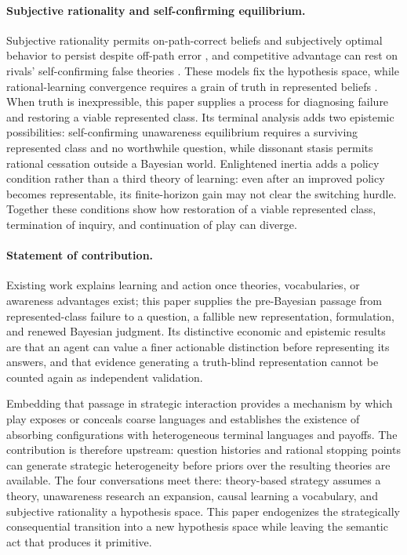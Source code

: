 \documentclass[11pt]{article}
\theoremstyle{definition}
\begin{document}
\paragraph{Subjective rationality and self-confirming equilibrium.}
Subjective rationality permits on-path-correct beliefs and subjectively optimal behavior to persist despite off-path error \citep{KalaiLehrer1993b,FudenbergLevine1993}, and competitive advantage can rest on rivals' self-confirming false theories \citep{Ryall2003}.
These models fix the hypothesis space, while rational-learning convergence requires a grain of truth in represented beliefs \citep{KalaiLehrer1993a}.
When truth is inexpressible, this paper supplies a process for diagnosing failure and restoring a viable represented class.
Its terminal analysis adds two epistemic possibilities: self-confirming unawareness equilibrium requires a surviving represented class and no worthwhile question, while dissonant stasis permits rational cessation outside a Bayesian world.
Enlightened inertia adds a policy condition rather than a third theory of learning: even after an improved policy becomes representable, its finite-horizon gain may not clear the switching hurdle.
Together these conditions show how restoration of a viable represented class, termination of inquiry, and continuation of play can diverge.

\paragraph{Statement of contribution.}
Existing work explains learning and action once theories, vocabularies, or awareness advantages exist; this paper supplies the pre-Bayesian passage from represented-class failure to a question, a fallible new representation, formulation, and renewed Bayesian judgment.
Its distinctive economic and epistemic results are that an agent can value a finer actionable distinction before representing its answers, and that evidence generating a truth-blind representation cannot be counted again as independent validation.

Embedding that passage in strategic interaction provides a mechanism by which play exposes or conceals coarse languages and establishes the existence of absorbing configurations with heterogeneous terminal languages and payoffs.
The contribution is therefore upstream: question histories and rational stopping points can generate strategic heterogeneity before priors over the resulting theories are available.
The four conversations meet there: theory-based strategy assumes a theory, unawareness research an expansion, causal learning a vocabulary, and subjective rationality a hypothesis space.
This paper endogenizes the strategically consequential transition into a new hypothesis space while leaving the semantic act that produces it primitive.
\end{document}
